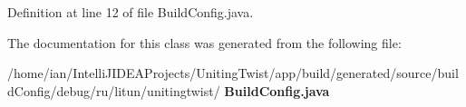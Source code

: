 Definition at line 12 of file Build\+Config.\+java.



The documentation for this class was generated from the following file\+:\begin{DoxyCompactItemize}
\item 
/home/ian/\+Intelli\+J\+I\+D\+E\+A\+Projects/\+Uniting\+Twist/app/build/generated/source/build\+Config/debug/ru/litun/unitingtwist/\textbf{ Build\+Config.\+java}\end{DoxyCompactItemize}
